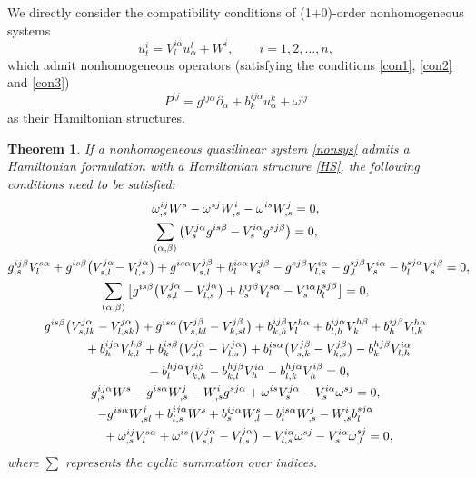 \documentclass[10pt,a4paper]{amsart}
\numberwithin{equation}{section}
\newtheorem{Theorem}{Theorem}[section]
\begin{document}
We directly consider the compatibility conditions of (1+0)-order nonhomogeneous systems
\begin{equation}\label{nonsys}
u^i_t=V^{i\alpha}_lu^l_\alpha+W^i, \qquad i=1,2,\dots, n,
\end{equation}
which admit nonhomogeneous operators (satisfying the conditions \eqref{con1}, \eqref{con2} and \eqref{con3})
\begin{equation}\label{HS}
P^{ij}=g^{ij\alpha}\partial_\alpha+b^{ij\alpha}_ku^k_\alpha+\omega^{ij}
\end{equation}
as their Hamiltonian structures.
\begin{Theorem}\label{theorem8}
If a nonhomogeneous quasilinear system \eqref{nonsys} admits a Hamiltonian formulation with a Hamiltonian structure \eqref{HS}, the following conditions need to be satisfied:
\begin{subequations}
\begin{gather}
\omega^{ij}_{,s}W^s-\omega^{sj}W^i_{,s}-\omega^{is}W^j_{,s}=0,\label{syscon1}\\
\sum_{(\alpha,\beta)}\big(V^{j\alpha}_sg^{is\beta}-V^{i\alpha}_sg^{sj\beta}\big)=0,\label{syscon2}\\
g^{ij\beta}_{,s}V^{s\alpha}_l+g^{is\beta}\big(V^{j\alpha}_{s,l}\!-V^{j\alpha}_{l,s}\big)+g^{is\alpha}V^{j\beta}_{s,l}
+b^{is\alpha}_lV^{j\beta}_s-g^{sj\beta}V^{i\alpha}_{l,s}-g^{sj\beta}_{,l}V^{i\alpha}_s-b^{sj\alpha}_lV^{i\beta}_s
=0,\!\!\!\label{syscon3}\\
\sum_{(\alpha,\beta)}\big[g^{is\beta}\big(V^{j\alpha}_{s,l}-V^{j\alpha}_{l,s}\big)+b^{ij\beta}_sV^{s\alpha}_l-V^{i\alpha}_sb^{sj\beta}_l\big]=0,\label{syscon4}\\
g^{is\beta}\big(V^{j\alpha}_{s,lk}-V^{j\alpha}_{l,sk}\big)+g^{is\alpha}\big(V^{j\beta}_{s,kl}-V^{j\beta}_{k,sl}\big)+b^{ij\beta}_{k,h}V^{h\alpha}_l+b^{ij\alpha}_{l,h}V^{h\beta}_k +b^{ij\beta}_hV^{h\alpha}_{l,k}\notag \\
\qquad{}+b^{ij\alpha}_hV^{h\beta}_{k,l}+b^{is\beta}_k\big(V^{j\alpha}_{s,l}
-V^{j\alpha}_{l,s}\big)+b^{is\alpha}_l\big(V^{j\beta}_{s,k}-V^{j\beta}_{k,s}\big) -b^{hj\beta}_kV^{i\alpha}_{l,h}\notag \\
\qquad{}
-b^{hj\alpha}_lV^{i\beta}_{k,h}-b^{hj\beta}_{k,l}V^{i\alpha}_h-b^{hj\alpha}_{l,k}V^{i\beta}_h=0,\label{syscon5}\\
g^{ij\alpha}_{,s}W^s-g^{is\alpha}W^j_{,s}-W^i_{,s}g^{sj\alpha}+\omega^{is}V^{j\alpha}_s-V^{i\alpha}_s\omega^{sj}=0,\label{syscon6}\\
-g^{is\alpha}W^j_{,sl}+b^{ij\alpha}_{l,s}W^s+b^{ij\alpha}_sW^s_{,l}-b^{is\alpha}_lW^j_{,s}-W^i_{,s}b^{sj\alpha}_l \notag \\
\qquad{}+\omega^{ij}_{,s}V^{s\alpha}_l+\omega^{is}\big(V^{j\alpha}_{s,l}-V^{j\alpha}_{l,s}\big)-V^{i\alpha}_{l,s}\omega^{sj}-V^{i\alpha}_s\omega^{sj}_{,l}=0,\label{syscon7}
\end{gather}
\end{subequations}
where $\sum$ represents the cyclic summation over indices.
\end{Theorem}
\end{document}
